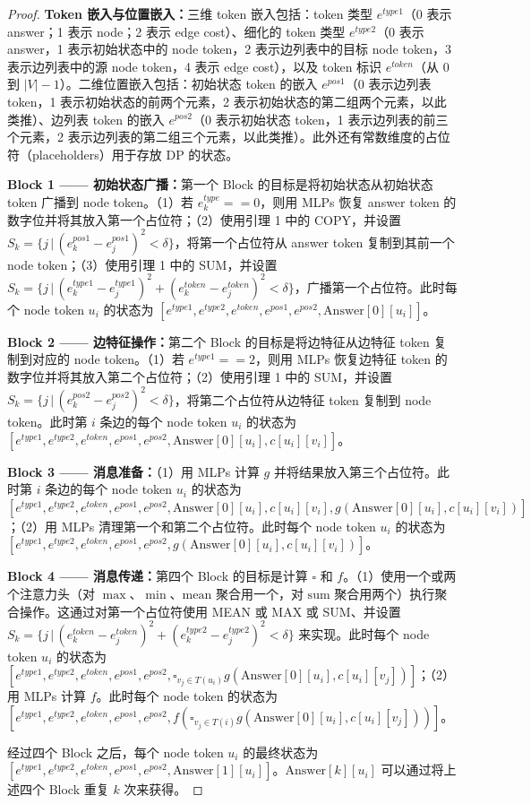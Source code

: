 \documentclass[11pt,UTF8,fontset=fandol]{ctexart}
\begin{document}
\begin{proof}
\textbf{Token 嵌入与位置嵌入：}三维 token 嵌入包括：token 类型 $e^{type1}$（0 表示 answer；1 表示 node；2 表示 edge cost）、细化的 token 类型 $e^{type2}$（0 表示 answer，1 表示初始状态中的 node token，2 表示边列表中的目标 node token，3 表示边列表中的源 node token，4 表示 edge cost），以及 token 标识 $e^{token}$（从 0 到 $|V|-1$）。二维位置嵌入包括：初始状态 token 的嵌入 $e^{pos1}$（0 表示边列表 token，1 表示初始状态的前两个元素，2 表示初始状态的第二组两个元素，以此类推）、边列表 token 的嵌入 $e^{pos2}$（0 表示初始状态 token，1 表示边列表的前三个元素，2 表示边列表的第二组三个元素，以此类推）。此外还有常数维度的占位符（placeholders）用于存放 DP 的状态。

\textbf{Block 1 —— 初始状态广播：}第一个 Block 的目标是将初始状态从初始状态 token 广播到 node token。（1）若 $e_k^{type}==0$，则用 MLPs 恢复 answer token 的数字位并将其放入第一个占位符；（2）使用引理 1 中的 COPY，并设置 $S_k = \{j\,|\,(e_k^{pos1}-e_j^{pos1})^2<\delta\}$，将第一个占位符从 answer token 复制到其前一个 node token；（3）使用引理 1 中的 SUM，并设置 $S_k = \{j\,|\,(e_k^{type1}-e_j^{type1})^2+(e_k^{token}-e_j^{token})^2<\delta\}$，广播第一个占位符。此时每个 node token $u_i$ 的状态为 $[e^{type1}, e^{type2}, e^{token}, e^{pos1}, e^{pos2}, \mathrm{Answer}[0][u_i]]$。

\textbf{Block 2 —— 边特征操作：}第二个 Block 的目标是将边特征从边特征 token 复制到对应的 node token。（1）若 $e^{type1}==2$，则用 MLPs 恢复边特征 token 的数字位并将其放入第二个占位符；（2）使用引理 1 中的 SUM，并设置 $S_k = \{j\,|\,(e_k^{pos2}-e_j^{pos2})^2<\delta\}$，将第二个占位符从边特征 token 复制到 node token。此时第 $i$ 条边的每个 node token $u_i$ 的状态为 $[e^{type1}, e^{type2}, e^{token}, e^{pos1}, e^{pos2}, \mathrm{Answer}[0][u_i], c[u_i][v_i]]$。

\textbf{Block 3 —— 消息准备：}（1）用 MLPs 计算 $g$ 并将结果放入第三个占位符。此时第 $i$ 条边的每个 node token $u_i$ 的状态为 $[e^{type1}, e^{type2}, e^{token}, e^{pos1}, e^{pos2}, \mathrm{Answer}[0][u_i], c[u_i][v_i], g(\mathrm{Answer}[0][u_i], c[u_i][v_i])]$；（2）用 MLPs 清理第一个和第二个占位符。此时每个 node token $u_i$ 的状态为 $[e^{type1}, e^{type2}, e^{token}, e^{pos1}, e^{pos2}, g(\mathrm{Answer}[0][u_i], c[u_i][v_i])]$。

\textbf{Block 4 —— 消息传递：}第四个 Block 的目标是计算 $\square$ 和 $f$。（1）使用一个或两个注意力头（对 $\max$、$\min$、$\mathrm{mean}$ 聚合用一个，对 $\mathrm{sum}$ 聚合用两个）执行聚合操作。这通过对第一个占位符使用 MEAN 或 MAX 或 SUM、并设置 $S_k = \{j\,|\,(e_k^{token}-e_j^{token})^2+(e_k^{type2}-e_j^{type2})^2<\delta\}$ 来实现。此时每个 node token $u_i$ 的状态为 $[e^{type1}, e^{type2}, e^{token}, e^{pos1}, e^{pos2}, \square_{v_j\in T(u_i)} g(\mathrm{Answer}[0][u_i], c[u_i][v_j])]$；（2）用 MLPs 计算 $f$。此时每个 node token 的状态为 $[e^{type1}, e^{type2}, e^{token}, e^{pos1}, e^{pos2}, f(\square_{v_j\in T(i)} g(\mathrm{Answer}[0][u_i], c[u_i][v_j]))]$。

经过四个 Block 之后，每个 node token $u_i$ 的最终状态为 $[e^{type1}, e^{type2}, e^{token}, e^{pos1}, e^{pos2}, \mathrm{Answer}[1][u_i]]$。$\mathrm{Answer}[k][u_i]$ 可以通过将上述四个 Block 重复 $k$ 次来获得。
\end{proof}
\end{document}
